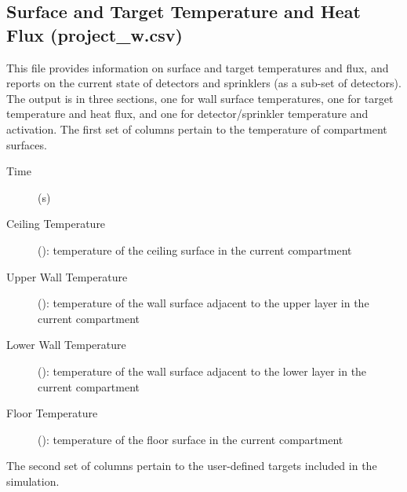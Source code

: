 \subsection{Surface and Target Temperature and Heat Flux (project\_w.csv)}

This file provides information on surface and target temperatures and flux, and reports on the current state of detectors and sprinklers (as a sub-set of detectors). The output is in three sections, one for wall surface temperatures, one for target temperature and heat flux, and one for detector/sprinkler temperature and activation. The first set of columns pertain to the temperature of compartment surfaces.
\begin{description}
\item[Time] (s)
\item[Ceiling Temperature] (\degc): temperature of the ceiling surface in the current compartment
\item[Upper Wall Temperature] (\degc): temperature of the wall surface adjacent to the upper layer in the current compartment
\item[Lower Wall Temperature] (\degc): temperature of the  wall surface adjacent to the lower layer in the current compartment
\item[Floor Temperature] (\degc): temperature of the floor surface in the current compartment
\end{description}
The second set of columns pertain to the user-defined targets included in the simulation.
